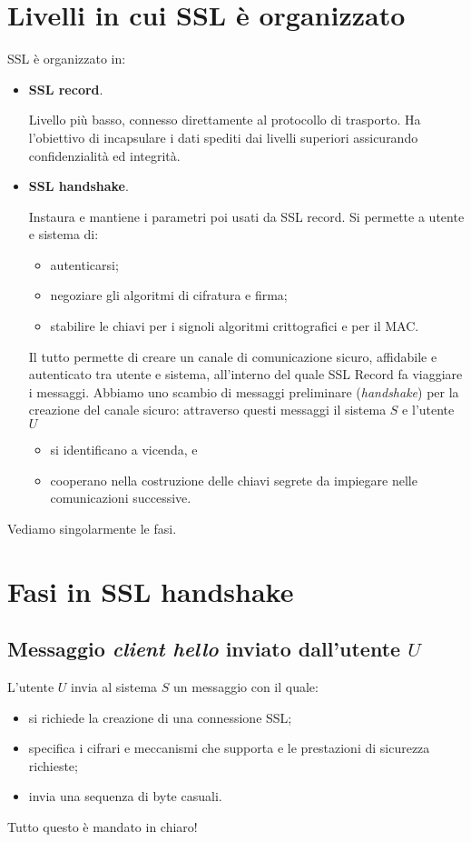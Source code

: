 \section{Livelli in cui SSL è organizzato}
SSL è organizzato in:
\begin{itemize}
	\item \textbf{SSL record}.
	
	Livello più basso, connesso direttamente al protocollo di trasporto. Ha l'obiettivo di incapsulare i dati spediti dai livelli superiori assicurando confidenzialità ed integrità.
	
	\item \textbf{SSL handshake}.
	
	Instaura e mantiene i parametri poi usati da SSL record. Si permette a utente e sistema di:
	\begin{itemize}
		\item autenticarsi;
		\item negoziare gli algoritmi di cifratura e firma;
		\item stabilire le chiavi per i signoli algoritmi crittografici e per il MAC.
	\end{itemize}
	Il tutto permette di creare un canale di comunicazione sicuro, affidabile e autenticato tra utente e sistema, all'interno del quale SSL Record fa viaggiare i messaggi. Abbiamo uno scambio di messaggi preliminare (\emph{handshake}) per la creazione del canale sicuro: attraverso questi messaggi il sistema $S$ e l'utente $U$
	\begin{itemize}
		\item si identificano a vicenda, e
		\item cooperano nella costruzione delle chiavi segrete da impiegare nelle comunicazioni successive.
	\end{itemize}
\end{itemize}
Vediamo singolarmente le fasi.

\section{Fasi in SSL handshake}
\subsection{Messaggio \emph{client hello} inviato dall'utente $U$}
L'utente $U$ invia al sistema $S$ un messaggio con il quale:
\begin{itemize}
	\item si richiede la creazione di una connessione SSL;
	\item specifica i cifrari e meccanismi che supporta e le prestazioni di sicurezza richieste;
	\item invia una sequenza di byte casuali.
\end{itemize} 
Tutto questo è mandato in chiaro!

